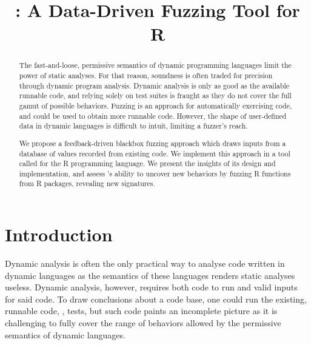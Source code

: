 \documentclass[sigplan,nonacm,anonymous,review]{acmart}
\begin{document}
\title{\tool: A Data-Driven Fuzzing Tool for R}

\begin{abstract}
The fast-and-loose, permissive semantics of dynamic programming
languages limit the power of static analyses. For that reason, soundness is often
traded for precision through dynamic program analysis.  Dynamic
analysis is only as good as the available runnable code, and relying
solely on test suites is fraught as they do not cover the full gamut of
possible behaviors. Fuzzing is an approach for automatically
exercising code, and could be used to obtain more runnable code.
However, the shape of user-defined data in dynamic languages is
difficult to intuit, limiting a fuzzer's reach.  

We propose a feedback-driven blackbox fuzzing approach which draws inputs from a
database of values recorded from existing code.  We implement this
approach in a tool called \tool for the R programming language.  We
present the insights of its design and implementation, and assess
\tool's ability to uncover new behaviors by fuzzing \UFNumFunctions R
functions from \UFNumPackages R packages, revealing
\UFSignatrSignatures new signatures.
\end{abstract}

\maketitle

\section{Introduction}\label{sec:introduction}

Dynamic analysis is often the only practical way to analyse code
written in dynamic languages as the semantics of these languages
renders static analyses useless.  Dynamic analysis, however, requires
both code to run and valid inputs for said code. To draw conclusions
about a code base, one could run the existing, runnable code, \Eg,
tests, but such code paints an incomplete picture as it is challenging
to fully cover the range of behaviors allowed by the permissive
semantics of dynamic languages.
\end{document}
